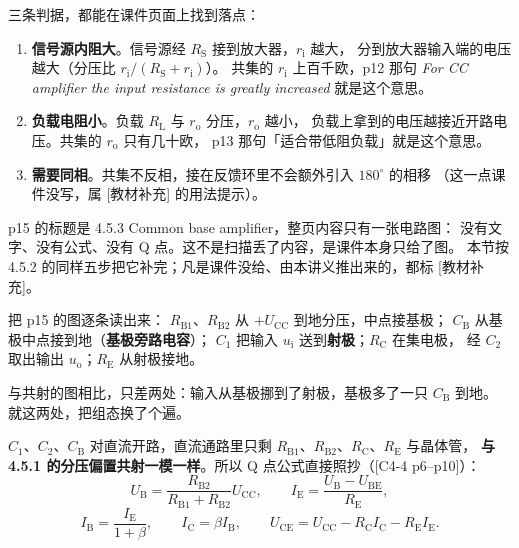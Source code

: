 \documentclass[11pt]{ctexart}
\begin{document}
三条判据，都能在课件页面上找到落点：
\begin{enumerate}
\item \textbf{信号源内阻大}。信号源经 $R_{\mathrm{S}}$ 接到放大器，$r_{\mathrm{i}}$ 越大，
分到放大器输入端的电压越大（分压比 $r_{\mathrm{i}}/(R_{\mathrm{S}}+r_{\mathrm{i}})$）。
共集的 $r_{\mathrm{i}}$ 上百千欧，p12 那句 \textit{For CC amplifier the input resistance is greatly increased}
就是这个意思。
\item \textbf{负载电阻小}。负载 $R_{\mathrm{L}}$ 与 $r_{\mathrm{o}}$ 分压，$r_{\mathrm{o}}$ 越小，
负载上拿到的电压越接近开路电压。共集的 $r_{\mathrm{o}}$ 只有几十欧，
p13 那句「适合带低阻负载」就是这个意思。
\item \textbf{需要同相}。共集不反相，接在反馈环里不会额外引入 $180^\circ$ 的相移
（这一点课件没写，属 [教材补充] 的用法提示）。
\end{enumerate}




p15 的标题是 4.5.3 Common base amplifier，整页内容只有一张电路图：
没有文字、没有公式、没有 Q 点。这不是扫描丢了内容，是课件本身只给了图。
本节按 4.5.2 的同样五步把它补完；凡是课件没给、由本讲义推出来的，都标 [教材补充]。


把 p15 的图逐条读出来：
$R_{\mathrm{B1}}$、$R_{\mathrm{B2}}$ 从 $+U_{\mathrm{CC}}$ 到地分压，中点接基极；
$C_{\mathrm{B}}$ 从基极中点接到地（\textbf{基极旁路电容}）；
$C_1$ 把输入 $u_{\mathrm{i}}$ 送到\textbf{射极}；$R_{\mathrm{C}}$ 在集电极，
经 $C_2$ 取出输出 $u_{\mathrm{o}}$；$R_{\mathrm{E}}$ 从射极接地。

与共射的图相比，只差两处：输入从基极挪到了射极，基极多了一只 $C_{\mathrm{B}}$ 到地。
就这两处，把组态换了个遍。


$C_1$、$C_2$、$C_{\mathrm{B}}$ 对直流开路，直流通路里只剩
$R_{\mathrm{B1}}$、$R_{\mathrm{B2}}$、$R_{\mathrm{C}}$、$R_{\mathrm{E}}$ 与晶体管，
\textbf{与 4.5.1 的分压偏置共射一模一样}。所以 Q 点公式直接照抄（[C4-4 p6--p10]）：
\[
U_{\mathrm{B}}=\frac{R_{\mathrm{B2}}}{R_{\mathrm{B1}}+R_{\mathrm{B2}}}U_{\mathrm{CC}},\qquad
I_{\mathrm{E}}=\frac{U_{\mathrm{B}}-U_{\mathrm{BE}}}{R_{\mathrm{E}}},
\]
\[
I_{\mathrm{B}}=\frac{I_{\mathrm{E}}}{1+\beta},\qquad I_{\mathrm{C}}=\beta I_{\mathrm{B}},\qquad
U_{\mathrm{CE}}=U_{\mathrm{CC}}-R_{\mathrm{C}}I_{\mathrm{C}}-R_{\mathrm{E}}I_{\mathrm{E}} .
\]
\end{document}
